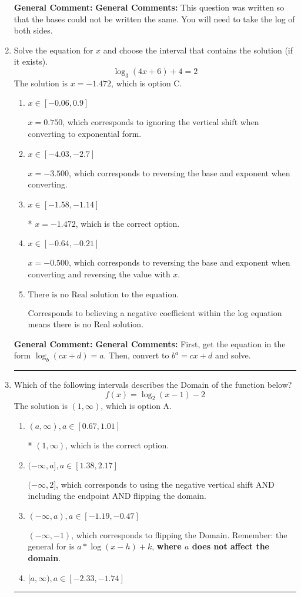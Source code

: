 \documentclass{extbook}[14pt]
\newcommand{\litem}[1]{\item #1

\rule{\textwidth}{0.4pt}}
\begin{document}
\begin{enumerate}
{\textbf{General Comment:} \textbf{General Comments:} This question was written so that the bases could not be written the same. You will need to take the log of both sides.
}
\litem{
Solve the equation for $x$ and choose the interval that contains the solution (if it exists).
\[ \log_{3}{(4x+6)}+4 = 2 \]The solution is \( x = -1.472 \), which is option C.\begin{enumerate}[label=\Alph*.]
\item \( x \in [-0.06, 0.9] \)

$x = 0.750$, which corresponds to ignoring the vertical shift when converting to exponential form.
\item \( x \in [-4.03, -2.7] \)

$x = -3.500$, which corresponds to reversing the base and exponent when converting.
\item \( x \in [-1.58, -1.14] \)

* $x = -1.472$, which is the correct option.
\item \( x \in [-0.64, -0.21] \)

$x = -0.500$, which corresponds to reversing the base and exponent when converting and reversing the value with $x$.
\item \( \text{There is no Real solution to the equation.} \)

Corresponds to believing a negative coefficient within the log equation means there is no Real solution.
\end{enumerate}

\textbf{General Comment:} \textbf{General Comments:} First, get the equation in the form $\log_b{(cx+d)} = a$. Then, convert to $b^a = cx+d$ and solve.
}
\litem{
Which of the following intervals describes the Domain of the function below?
\[ f(x) = \log_2{(x-1)}-2 \]The solution is \( (1, \infty) \), which is option A.\begin{enumerate}[label=\Alph*.]
\item \( (a, \infty), a \in [0.67, 1.01] \)

* $(1, \infty)$, which is the correct option.
\item \( (-\infty, a], a \in [1.38, 2.17] \)

$(-\infty, 2]$, which corresponds to using the negative vertical shift AND including the endpoint AND flipping the domain.
\item \( (-\infty, a), a \in [-1.19, -0.47] \)

$(-\infty, -1)$, which corresponds to flipping the Domain. Remember: the general for is $a*\log(x-h)+k$, \textbf{where $a$ does not affect the domain}.
\item \( [a, \infty), a \in [-2.33, -1.74] \)


\end{enumerate}}
\end{enumerate}
\end{document}
